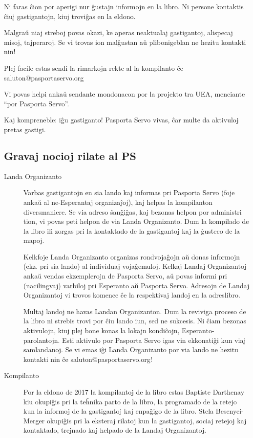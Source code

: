 {Ni faras ĉion por aperigi nur ĝustajn informojn en la libro. Ni persone
kontaktis ĉiuj gastigantojn, kiuj troviĝas en la eldono.

Malgraŭ niaj streboj povas okazi, ke aperas neaktualaj gastigantoj,
alispecaj misoj, tajperaroj. Se vi trovas ion malĝustan aŭ plibonigeblan
ne hezitu kontakti nin!

Plej facile estas sendi la rimarkojn rekte al la kompilanto ĉe
saluton@pasportaservo.org

Vi povas helpi ankaŭ sendante mondonacon por la projekto tra UEA,
menciante ``por Pasporta Servo''.

Kaj kompreneble: iĝu gastiganto! Pasporta Servo vivas, ĉar multe da
aktivuloj pretas gastigi.

\subsection{Gravaj nocioj rilate al PS}

\begin{description}
\item[Landa Organizanto]
Varbas gastigantojn en sia lando kaj informas pri Pasporta Servo (foje
ankaŭ al ne-Esperantaj organizaĵoj), kaj helpas la kompilanton
diversmaniere. Se via adreso ŝanĝiĝas, kaj bezonas helpon por administri
tion, vi povas peti helpon de via Landa Organizanto. Dum la kompilado de
la libro ili zorgas pri la kontaktado de la gastigantoj kaj la ĝusteco
de la mapoj.

Kelkfoje Landa Organizanto organizas rondvojaĝojn aŭ donas informojn
(ekz. pri sia lando) al individuaj vojaĝemuloj. Kelkaj Landaj
Organizantoj ankaŭ vendas ekzemplerojn de Pasporta Servo, aŭ povas
informi pri (nacilingvaj) varbiloj pri Esperanto aŭ Pasporta Servo.
Adresojn de Landaj Organizantoj vi trovos komence ĉe la respektivaj
landoj en la adreslibro.

Multaj landoj ne havas Landan Organizanton. Dum la reviviga proceso de
la libro ni strebis trovi por ĉiu lando iun, sed ne sukcesis. Ni ĉiam
bezonas aktivulojn, kiuj plej bone konas la lokajn kondiĉojn,
Esperanto-parolantojn. Esti aktivulo por Pasporta Servo igas vin
ekkonatiĝi kun viaj samlandanoj. Se vi emas iĝi Landa Organizanto por
via lando ne hezitu kontakti nin ĉe saluton@pasportaservo.org!
\end{description}

\begin{description}
\item[Kompilanto]
Por la eldono de 2017 la kompilantoj de la libro estas Baptiste
Darthenay kiu okupiĝis pri la teĥnika parto de la libro, la programado
de la retejo kun la informoj de la gastigantoj kaj enpaĝigo de la libro.
Stela Besenyei-Merger okupiĝis pri la eksteraj rilatoj kun la
gastigantoj, sociaj retejoj kaj kontaktado, trejnado kaj helpado de la
Landaj Organizantoj.


\end{description}}
